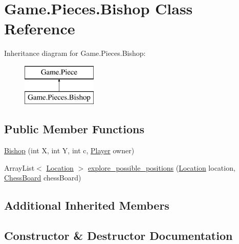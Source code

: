 \hypertarget{class_game_1_1_pieces_1_1_bishop}{}\section{Game.\+Pieces.\+Bishop Class Reference}
\label{class_game_1_1_pieces_1_1_bishop}
Inheritance diagram for Game.\+Pieces.\+Bishop\+:\begin{figure}[H]
\begin{center}
\leavevmode
\includegraphics[height=2.000000cm]{class_game_1_1_pieces_1_1_bishop}
\end{center}
\end{figure}
\subsection*{Public Member Functions}
\begin{DoxyCompactItemize}
\item 
\hyperlink{class_game_1_1_pieces_1_1_bishop_a45e6ea33dbe889b2a5b4fb5e9f98ef2f}{Bishop} (int X, int Y, int c, \hyperlink{class_game_1_1_player}{Player} owner)
\item 
Array\+List$<$ \hyperlink{class_game_1_1_location}{Location} $>$ \hyperlink{class_game_1_1_pieces_1_1_bishop_ae20890bce6010a38c8925f02c2881c95}{explore\+\_\+possible\+\_\+positions} (\hyperlink{class_game_1_1_location}{Location} location, \hyperlink{class_game_1_1_chess_board}{Chess\+Board} chess\+Board)
\end{DoxyCompactItemize}
\subsection*{Additional Inherited Members}


\subsection{Constructor \& Destructor Documentation}
\mbox{\label{class_game_1_1_pieces_1_1_bishop_a45e6ea33dbe889b2a5b4fb5e9f98ef2f}} 
